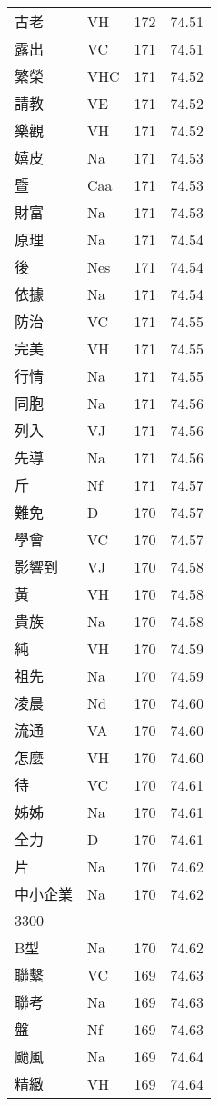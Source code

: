 \documentclass[twocolumn]{book}
\begin{document}
\begin{supertabular}{llrr}
古老 & VH & 172 &  74.51\\
露出 & VC & 171 &  74.51\\
繁榮 & VHC & 171 &  74.52\\
請教 & VE & 171 &  74.52\\
樂觀 & VH & 171 &  74.52\\
嬉皮 & Na & 171 &  74.53\\
暨 & Caa & 171 &  74.53\\
財富 & Na & 171 &  74.53\\
原理 & Na & 171 &  74.54\\
後 & Nes & 171 &  74.54\\
依據 & Na & 171 &  74.54\\
防治 & VC & 171 &  74.55\\
完美 & VH & 171 &  74.55\\
行情 & Na & 171 &  74.55\\
同胞 & Na & 171 &  74.56\\
列入 & VJ & 171 &  74.56\\
先導 & Na & 171 &  74.56\\
斤 & Nf & 171 &  74.57\\
難免 & D & 170 &  74.57\\
學會 & VC & 170 &  74.57\\
影響到 & VJ & 170 &  74.58\\
黃 & VH & 170 &  74.58\\
貴族 & Na & 170 &  74.58\\
純 & VH & 170 &  74.59\\
祖先 & Na & 170 &  74.59\\
凌晨 & Nd & 170 &  74.60\\
流通 & VA & 170 &  74.60\\
怎麼 & VH & 170 &  74.60\\
待 & VC & 170 &  74.61\\
姊姊 & Na & 170 &  74.61\\
全力 & D & 170 &  74.61\\
片 & Na & 170 &  74.62\\
中小企業 & Na & 170 &  74.62\\
3300\\
B型 & Na & 170 &  74.62\\
聯繫 & VC & 169 &  74.63\\
聯考 & Na & 169 &  74.63\\
盤 & Nf & 169 &  74.63\\
颱風 & Na & 169 &  74.64\\
精緻 & VH & 169 &  74.64\\

\end{supertabular}
\end{document}
